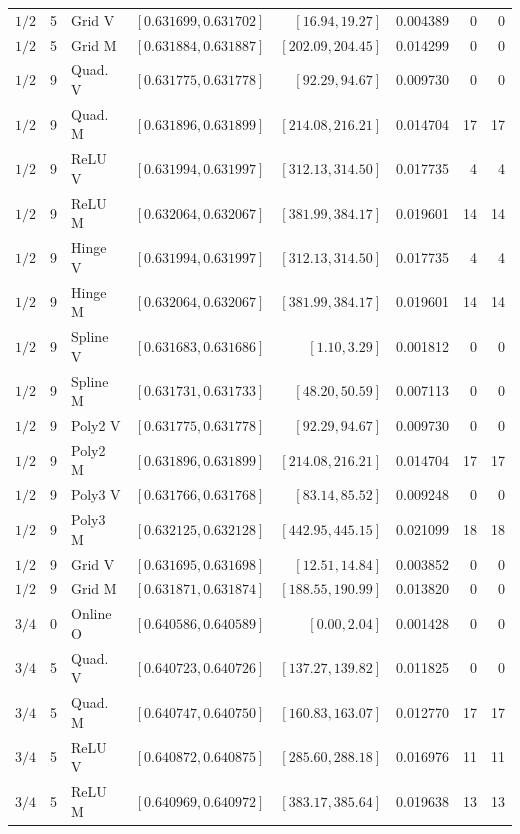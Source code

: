 \begin{longtable}{rrlrrrrr}
$1/2$ & 5 & Grid V & $[0.631699,0.631702]$ & $[16.94,19.27]$ & 0.004389 & 0 & 0\\
$1/2$ & 5 & Grid M & $[0.631884,0.631887]$ & $[202.09,204.45]$ & 0.014299 & 0 & 0\\
$1/2$ & 9 & Quad. V & $[0.631775,0.631778]$ & $[92.29,94.67]$ & 0.009730 & 0 & 0\\
$1/2$ & 9 & Quad. M & $[0.631896,0.631899]$ & $[214.08,216.21]$ & 0.014704 & 17 & 17\\
$1/2$ & 9 & ReLU V & $[0.631994,0.631997]$ & $[312.13,314.50]$ & 0.017735 & 4 & 4\\
$1/2$ & 9 & ReLU M & $[0.632064,0.632067]$ & $[381.99,384.17]$ & 0.019601 & 14 & 14\\
$1/2$ & 9 & Hinge V & $[0.631994,0.631997]$ & $[312.13,314.50]$ & 0.017735 & 4 & 4\\
$1/2$ & 9 & Hinge M & $[0.632064,0.632067]$ & $[381.99,384.17]$ & 0.019601 & 14 & 14\\
$1/2$ & 9 & Spline V & $[0.631683,0.631686]$ & $[1.10,3.29]$ & 0.001812 & 0 & 0\\
$1/2$ & 9 & Spline M & $[0.631731,0.631733]$ & $[48.20,50.59]$ & 0.007113 & 0 & 0\\
$1/2$ & 9 & Poly2 V & $[0.631775,0.631778]$ & $[92.29,94.67]$ & 0.009730 & 0 & 0\\
$1/2$ & 9 & Poly2 M & $[0.631896,0.631899]$ & $[214.08,216.21]$ & 0.014704 & 17 & 17\\
$1/2$ & 9 & Poly3 V & $[0.631766,0.631768]$ & $[83.14,85.52]$ & 0.009248 & 0 & 0\\
$1/2$ & 9 & Poly3 M & $[0.632125,0.632128]$ & $[442.95,445.15]$ & 0.021099 & 18 & 18\\
$1/2$ & 9 & Grid V & $[0.631695,0.631698]$ & $[12.51,14.84]$ & 0.003852 & 0 & 0\\
$1/2$ & 9 & Grid M & $[0.631871,0.631874]$ & $[188.55,190.99]$ & 0.013820 & 0 & 0\\
$3/4$ & 0 & Online O & $[0.640586,0.640589]$ & $[0.00,2.04]$ & 0.001428 & 0 & 0\\
$3/4$ & 5 & Quad. V & $[0.640723,0.640726]$ & $[137.27,139.82]$ & 0.011825 & 0 & 0\\
$3/4$ & 5 & Quad. M & $[0.640747,0.640750]$ & $[160.83,163.07]$ & 0.012770 & 17 & 17\\
$3/4$ & 5 & ReLU V & $[0.640872,0.640875]$ & $[285.60,288.18]$ & 0.016976 & 11 & 11\\
$3/4$ & 5 & ReLU M & $[0.640969,0.640972]$ & $[383.17,385.64]$ & 0.019638 & 13 & 13\\

\end{longtable}
